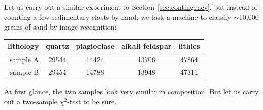 Let us carry out a similar experiment to
Section~\ref{sec:contingency}, but instead of counting a few
sedimentary clasts by hand, we task a machine to classify $\sim$10,000
grains of sand by image recognition:

\begin{center}
  \begin{tabular}{r|cccc}
    lithology & quartz & plagioclase & alkali feldspar & lithics  \\ \hline
    sample A & 29544 & 14424 & 13706 & 47864 \\
    sample B & 29454 & 14788 & 13948 & 47311
  \end{tabular}
  \label{tab:observedsand}
\end{center}

At first glance, the two samples look very similar in composition. But
let us carry out a two-sample $\chi^2$-test to be sure.

